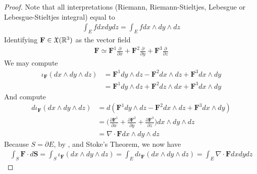 \documentclass{report}
\begin{document}
\begin{proof}
Note that all interpretations  (Riemann, Riemann-Stieltjes, Lebesgue or Lebesgue-Stieltjes integral) equal to 
\begin{align}
\label{cor4}
\int_E f dxdydz= \int_E f dx \wedge  dy \wedge  dz  
\end{align}
Identifying $\textbf{F}\in \mathfrak{X}(\mathbb{R}^3)$ as the vector field 
\begin{align*}
\textbf{F} \simeq \textbf{F}^1 \frac{\partial }{\partial x} + \textbf{F}^2 \frac{\partial }{\partial y} + \textbf{F}^3 \frac{\partial }{\partial z}
\end{align*}
We may compute 
\begin{align*}
\iota_\textbf{F}(dx\wedge dy \wedge  dz )&=  \textbf{F}^1dy \wedge  dz - \textbf{F}^2 dx \wedge  dz + \textbf{F}^3 dx \wedge  dy  \\
&= \textbf{F}^1dy \wedge  dz + \textbf{F}^2 dz \wedge  dx + \textbf{F}^3 dx \wedge  dy  
\end{align*}
And compute 
\begin{align*}
d\iota_\textbf{F} (dx \wedge  dy \wedge  dz  )&=d (  \textbf{F}^1dy \wedge  dz - \textbf{F}^2 dx \wedge  dz + \textbf{F}^3 dx \wedge  dy )  \\
&= \Big(\frac{\partial \textbf{F}^1}{\partial x}+ \frac{\partial \textbf{F}^2}{\partial y}+\frac{\partial \textbf{F}^3}{\partial z}\Big) dx\wedge  dy \wedge  dz  \\
&= \nabla \cdot \textbf{F}   dx \wedge  dy \wedge  dz  
\end{align*}
Because $S= \partial E$, by ,  and Stoke's Theorem, we now have   
\begin{align*}
\int_S \textbf{F} \cdot d \textbf{S} = \int_{S} \iota_\textbf{F} (dx\wedge  dy \wedge  dz)    =\int_E d \iota_\textbf{F} (dx \wedge  dy \wedge  dz) = \int_E \nabla \cdot \textbf{F} dxdydz
\end{align*}

\end{proof}
\end{document}
